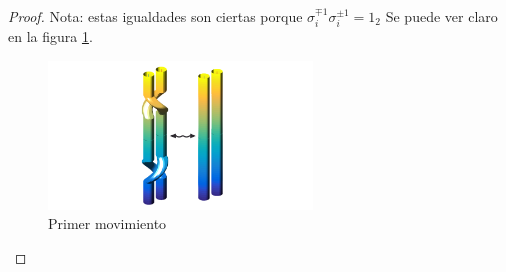 \begin{pro}
\begin{proof}
		 Nota: estas igualdades son ciertas porque $\sigma_{i}^{\mp 1} \sigma_{i}^{\pm 1} = 1_{2}$ Se puede ver claro en la figura \ref{demo1}.
	      	\begin{figure}[h!]
			\centering
			\includegraphics[width=7cm]{itrenzas/M1.png}
			\caption{Primer movimiento}
			\label{demo1} 
			\end{figure}	     
				
	\end{proof}
\end{pro}

